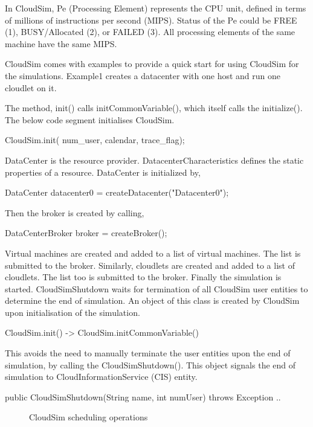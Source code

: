 \documentclass[times, 10pt,twocolumn]{article}
\begin{document}
In CloudSim, Pe (Processing Element) represents the CPU unit, defined in terms of millions of instructions per second (MIPS). Status of the Pe could be FREE (1), BUSY/Allocated (2), or FAILED (3). All processing elements of the same machine have the same MIPS.

CloudSim comes with examples to provide a quick start for using CloudSim for the simulations. Example1 creates a datacenter with one host and run one cloudlet on it. 

The method, init() calls initCommonVariable(), which itself calls the initialize(). The below code segment initialises CloudSim.
\begin{verbatimtab}
CloudSim.init(
    num_user, calendar, trace_flag);
\end{verbatimtab}
DataCenter is the resource provider. DatacenterCharacteristics defines the static properties of a resource. DataCenter is initialized by,
\begin{verbatimtab}
DataCenter datacenter0 = 
    createDatacenter("Datacenter0");
\end{verbatimtab}
Then the broker is created by calling,
\begin{verbatimtab}
DataCenterBroker broker = createBroker();
\end{verbatimtab}
Virtual machines are created and added to a list of virtual machines. The list is submitted to the broker. Similarly, cloudlets are created and added to a list of cloudlets. The list too is submitted to the broker. Finally the simulation is started.
CloudSimShutdown waits for termination of all CloudSim user entities to determine the end of simulation. An object of this class is created by CloudSim upon initialisation of the simulation.
\begin{verbatimtab}
CloudSim.init() -> 
    CloudSim.initCommonVariable()
\end{verbatimtab}
This avoids the need to manually terminate the user entities upon the end of simulation, by calling the CloudSimShutdown(). This object signals the end of simulation to CloudInformationService (CIS) entity.
\begin{verbatimtab}
public CloudSimShutdown(String name,
    int numUser) throws Exception { .. }
\end{verbatimtab}
\begin{figure}[ht]
 \caption{CloudSim scheduling operations}
 \label{fig:scheduling}
\end{figure}
\end{document}
